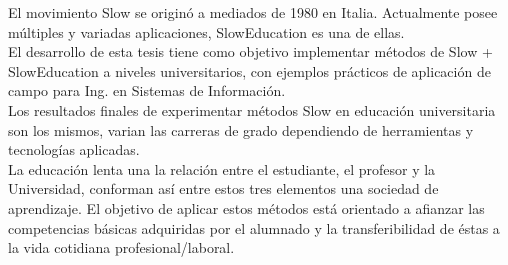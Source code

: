 % 
% 
%
El movimiento Slow se origin\'o a mediados de 1980 en Italia. Actualmente posee m\'ultiples y variadas aplicaciones, SlowEducation es una de ellas.\\
El desarrollo de esta tesis tiene como objetivo implementar m\'etodos de Slow + SlowEducation a niveles universitarios, con ejemplos pr\'acticos de 
aplicaci\'on de campo para Ing. en Sistemas de Informaci\'on.\\
Los resultados finales de experimentar m\'etodos Slow en educaci\'on universitaria son los mismos, varian las carreras de grado dependiendo de herramientas 
y tecnolog\'ias aplicadas.\\
La educaci\'on lenta una la relaci\'on entre el estudiante, el profesor y la Universidad, conforman as\'i entre estos tres elementos una sociedad de 
aprendizaje. El objetivo de aplicar estos m\'etodos est\'a orientado a afianzar las competencias b\'asicas adquiridas por el alumnado y la transferibilidad 
de \'estas a la vida cotidiana profesional/laboral.


